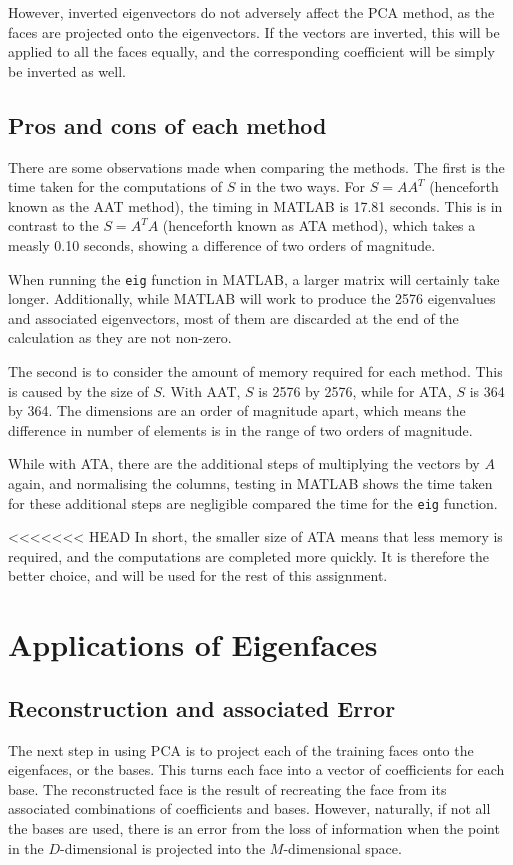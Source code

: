 \documentclass[a4paper, 10pt, conference]{ieeeconf}
\begin{document}
However, inverted eigenvectors do not adversely affect the PCA method, as the faces are projected onto the eigenvectors. If the vectors are inverted, this will be applied to all the faces equally, and the corresponding coefficient will be simply be inverted as well.

\subsection{Pros and cons of each method}
There are some observations made when comparing the methods. The first is the time taken for the computations of $S$ in the two ways. For $S = AA^T$ (henceforth known as the AAT method), the timing in MATLAB is 17.81 seconds. This is in contrast to the $S = A^T A$ (henceforth known as ATA method), which takes a measly 0.10 seconds, showing a difference of two orders of magnitude.

When running the \texttt{eig} function in MATLAB, a larger matrix will certainly take longer. Additionally, while MATLAB will work to produce the 2576 eigenvalues and associated eigenvectors, most of them are discarded at the end of the calculation as they are not non-zero.

The second is to consider the amount of memory required for each method. This is caused by the size of $S$. With AAT, $S$ is 2576 by 2576, while for ATA, $S$ is 364 by 364. The dimensions are an order of magnitude apart, which means the difference in number of elements is in the range of two orders of magnitude.

While with ATA, there are the additional steps of multiplying the vectors by $A$ again, and normalising the columns, testing in MATLAB shows the time taken for these additional steps are negligible compared the time for the \texttt{eig} function.

<<<<<<< HEAD
In short, the smaller size of ATA means that less memory is required, and the computations are completed more quickly. It is therefore the better choice, and will be used for the rest of this assignment.

\section{Applications of Eigenfaces}
\subsection{Reconstruction and associated Error}
The next step in using PCA is to project each of the training faces onto the eigenfaces, or the bases. This turns each face into a vector of coefficients for each base. The reconstructed face is the result of recreating the face from its associated combinations of coefficients and bases. However, naturally, if not all the bases are used, there is an error from the loss of information when the point in the $D$-dimensional is projected into the $M$-dimensional space.
\end{document}

